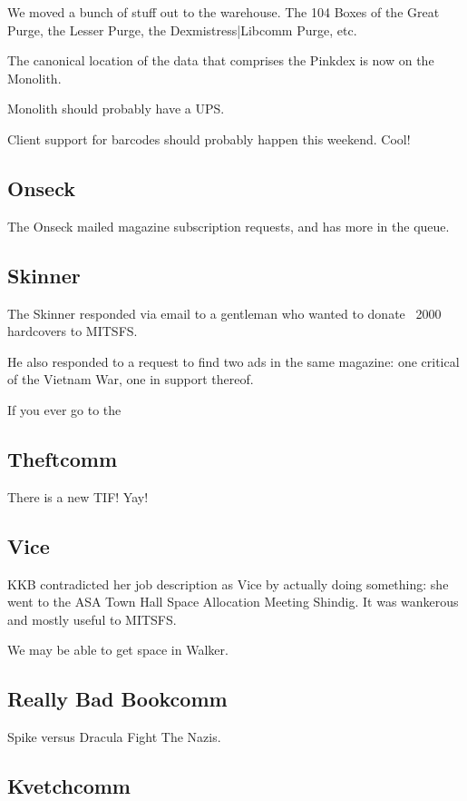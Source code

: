 \documentclass[10pt]{article}
\begin{document}
We moved a bunch of stuff out to the warehouse.  The 104 Boxes of the Great Purge, the Lesser Purge, the Dexmistress|Libcomm Purge, etc.

The canonical location of the data that comprises the Pinkdex is now on the Monolith.

Monolith should probably have a UPS.

Client support for barcodes should probably happen this weekend.  Cool!

\subsection*{Onseck}

The Onseck mailed magazine subscription requests, and has more in the queue.

\subsection*{Skinner}

The Skinner responded via email to a gentleman who wanted to donate ~2000 hardcovers to MITSFS.

He also responded to a request to find two ads in the same magazine: one critical of the Vietnam War, one in support thereof.

If you ever go to the 

\subsection*{Theftcomm}

There is a new TIF!  Yay!

\subsection*{Vice}

KKB contradicted her job description as Vice by actually doing something: she went to the ASA Town Hall Space Allocation Meeting Shindig.  It was wankerous and mostly useful to MITSFS.

We may be able to get space in Walker.

\subsection*{Really Bad Bookcomm}

Spike\texttrademark{} versus Dracula Fight The Nazis.

\subsection*{Kvetchcomm}
\end{document}
